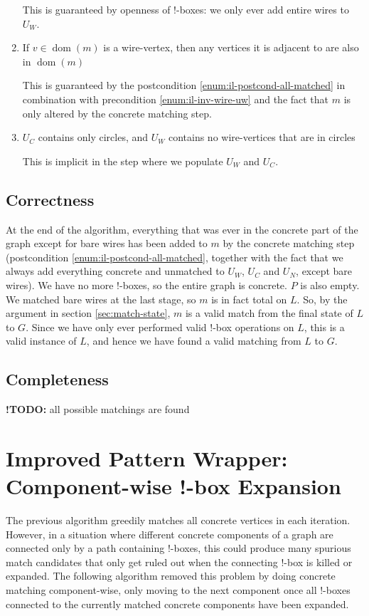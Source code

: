 \documentclass{article}
\DeclareMathOperator{\dom}{dom}
\newcommand{\TODOinline}[1]{%
\typeout{WARNING!!! there is still a TODO left}
{\color{blue}\textbf{!TODO: }#1}
}
\begin{document}
\begin{enumerate}[label=(\roman*),ref=(\roman*)]
  This is guaranteed by openness of $!$-boxes: we only ever add entire wires to $U_W$.
  \item If $v \in \dom(m)$ is a wire-vertex, then any vertices it is adjacent to are also in $\dom(m)$

  This is guaranteed by the postcondition \ref{enum:il-postcond-all-matched} in combination with precondition \ref{enum:il-inv-wire-uw} and the fact that $m$ is only altered by the concrete matching step.
  \item $U_C$ contains only circles, and $U_W$ contains no wire-vertices that are in circles

  This is implicit in the step where we populate $U_W$ and $U_C$.
\end{enumerate}

\subsection{Correctness}

At the end of the algorithm, everything that was ever in the concrete part of the graph except for bare wires has been added to $m$ by the concrete matching step (postcondition \ref{enum:il-postcond-all-matched}, together with the fact that we always add everything concrete and unmatched to $U_W$, $U_C$ and $U_N$, except bare wires).  We have no more $!$-boxes, so the entire graph is concrete.  $P$ is also empty.  We matched bare wires at the last stage, so $m$ is in fact total on $L$.  So, by the argument in section \ref{sec:match-state}, $m$ is a valid match from the final state of $L$ to $G$.  Since we have only ever performed valid $!$-box operations on $L$, this is a valid instance of $L$, and hence we have found a valid matching from $L$ to $G$.

\subsection{Completeness}

\TODOinline{all possible matchings are found}

\section{Improved Pattern Wrapper: Component-wise !-box Expansion}

The previous algorithm greedily matches all concrete vertices in each iteration. However, in a situation where different concrete components of a graph are connected only by a path containing !-boxes, this could produce many spurious match candidates that only get ruled out when the connecting !-box is killed or expanded. The following algorithm removed this problem by doing concrete matching component-wise, only moving to the next component once all !-boxes connected to the currently matched concrete components have been expanded.
\end{document}

